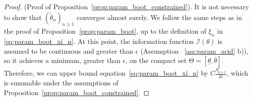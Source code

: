 \documentclass{article}
\theoremstyle{definition}
\renewcommand{\&}{and}
\begin{document}
\begin{proof}(Proof of Proposition~\ref{prop:param_boot_constrained}). It is not necessary to show that $(\tilde{\theta}_{n})_{n\geq 1}$ converges almost surely. We follow the same steps as in the proof of Proposition~\ref{prop:param_boot}, up to the definition of $\xi_n$ in \eqref{eq:param_boot_xi_n}. At this point, the information function $\mathcal{I}(\theta)$ is assumed to be continuous and greater than $\epsilon$ (Assumption ~\ref{ass:param_acid} b)), so it achieves a minimum, greater than $\epsilon$, on the compact set $\Theta=[\underline{\theta},\bar{\theta}]$. Therefore, we can upper bound equation~\eqref{eq:param_boot_xi_n} by $C \frac{\eta_{n+1}^2}{2\epsilon}$, which is summable under the assumptions of Proposition~\ref{prop:param_boot_constrained}. %
\end{proof}
\end{document}
